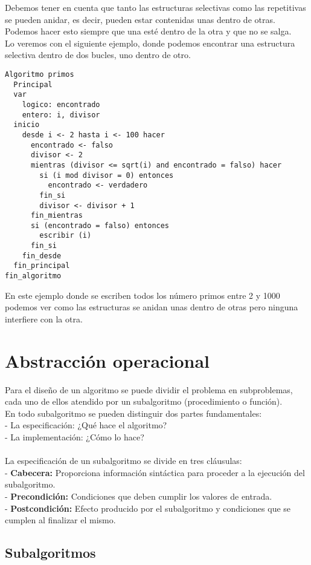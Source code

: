 \documentclass[12pt,letterpaper]{article}
\begin{document}
Debemos tener en cuenta que tanto las estructuras selectivas como las repetitivas se pueden anidar, es decir, pueden estar contenidas unas dentro de otras. Podemos hacer esto siempre que una esté dentro de la otra y que no se salga.\\
Lo veremos con el siguiente ejemplo, donde podemos encontrar una estructura selectiva dentro de dos bucles, uno dentro de otro.
\newpage
\begin{lstlisting}
Algoritmo primos
  Principal
  var
    logico: encontrado
    entero: i, divisor
  inicio
    desde i <- 2 hasta i <- 100 hacer
      encontrado <- falso
      divisor <- 2
      mientras (divisor <= sqrt(i) and encontrado = falso) hacer
        si (i mod divisor = 0) entonces
          encontrado <- verdadero
        fin_si
        divisor <- divisor + 1
      fin_mientras
      si (encontrado = falso) entonces
        escribir (i)
      fin_si
    fin_desde
  fin_principal
fin_algoritmo
\end{lstlisting}
En este ejemplo donde se escriben todos los número primos entre 2 y 1000 podemos ver como las estructuras se anidan unas dentro de otras pero ninguna interfiere con la otra.

\section{Abstracción operacional}

Para el diseño de un algoritmo se puede dividir el problema en subproblemas, cada uno de ellos atendido por un subalgoritmo (procedimiento o función).\\
En todo subalgoritmo se pueden distinguir dos partes fundamentales:\\
- La especificación: ¿Qué hace el algoritmo?\\
- La implementación: ¿Cómo lo hace?\\\\
La especificación de un subalgoritmo se divide en tres cláusulas:\\
- \textbf{Cabecera:} Proporciona información sintáctica para proceder a la ejecución del subalgoritmo.\\
- \textbf{Precondición:} Condiciones que deben cumplir los valores de entrada.\\
- \textbf{Postcondición:} Efecto producido por el subalgoritmo y condiciones que se cumplen al finalizar el mismo.

\subsection{Subalgoritmos}
\end{document}
